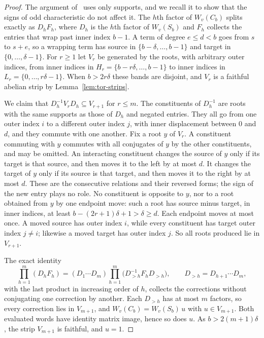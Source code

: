 \begin{proof}
The argument of~\cite{OAI247rf} uses only supports, and we recall it to show that the signs of odd characteristic do not
affect it. The $h$th factor of $W_v(C_b)$ splits exactly as $D_hF_h$, where $D_h$ is the $h$th factor of $W_v(S_b)$ and
$F_h$ collects the entries that wrap past inner index $b-1$. A term of degree $e\leq d<b$ goes from $s$ to $s+e$, so a
wrapping term has source in $\{b-\delta,\dots,b-1\}$ and target in $\{0,\dots,\delta-1\}$. For $r\geq1$ let $V_r$ be
generated by the roots, with arbitrary outer indices, from inner indices in $H_r=\{b-r\delta,\dots,b-1\}$ to inner
indices in $L_r=\{0,\dots,r\delta-1\}$. When $b>2r\delta$ these bands are disjoint, and $V_r$ is a faithful abelian strip
by Lemma~\ref{lem:tor-strips}.

We claim that $D_h^{-1}V_rD_h\subseteq V_{r+1}$ for $r\leq m$. The constituents of $D_h^{-1}$ are roots with the same
supports as those of $D_h$ and negated entries. They all go from one outer index $i$ to a different outer index $j$,
with inner displacement between $0$ and $d$, and they commute with one another. Fix a root $y$ of $V_r$. A constituent
commuting with $y$ commutes with all conjugates of $y$ by the other constituents, and may be omitted. An interacting
constituent changes the source of $y$ only if its target is that source, and then moves it to the left by at most $d$. It
changes the target of $y$ only if its source is that target, and then moves it to the right by at most $d$. These are
the consecutive relations and their reversed forms; the sign of the new entry plays no role. No constituent is opposite
to $y$, nor to a root obtained from $y$ by one endpoint move: such a root has source minus target, in inner indices, at
least $b-(2r+1)\delta+1>\delta\geq d$. Each endpoint moves at most once. A moved source has outer index $i$, while every
constituent has target outer index $j\neq i$; likewise a moved target has outer index $j$. So all roots produced lie in
$V_{r+1}$.

The exact identity
\[
 \prod_{h=1}^m(D_hF_h)=(D_1\cdots D_m)\prod_{h=1}^m\bigl(D_{>h}^{-1}F_hD_{>h}\bigr),\qquad D_{>h}=D_{h+1}\cdots D_m,
\]
with the last product in increasing order of $h$, collects the corrections without conjugating one correction by another.
Each $D_{>h}$ has at most $m$ factors, so every correction lies in $V_{m+1}$, and $W_v(C_b)=W_v(S_b)\,u$ with
$u\in V_{m+1}$. Both evaluated words have identity matrix image, hence so does $u$. As $b>2(m+1)\delta$, the strip
$V_{m+1}$ is faithful, and $u=1$.
\end{proof}

